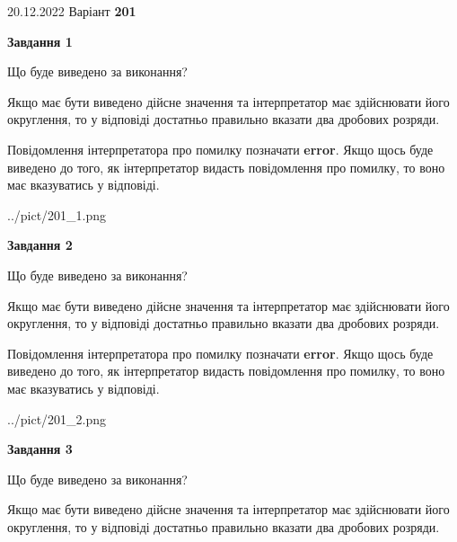 \documentclass[12pt, ukrainian]{article}
\begin{document}
{20.12.2022 Варіант \No \textbf { 201 }\par}
{
\begin {Large}

{\begin {center}\textbf{Завдання 1}\end {center}}\par
Що буде виведено за виконання? \par

Якщо має бути виведено дійсне значення та інтерпретатор має здійснювати його округлення, 
то у відповіді достатньо правильно вказати два дробових розряди.

Повідомлення інтерпретатора про помилку позначати \textbf{error}.
Якщо щось буде виведено до того, як інтерпретатор видасть повідомлення про помилку, 
то воно має вказуватись у відповіді. \par

\begin{center}
	{../pict/201_1.png}
\end{center}
\newpage

{\begin {center}\textbf{Завдання 2}\end {center}}\par
Що буде виведено за виконання? \par

Якщо має бути виведено дійсне значення та інтерпретатор має здійснювати його округлення, 
то у відповіді достатньо правильно вказати два дробових розряди.

Повідомлення інтерпретатора про помилку позначати \textbf{error}.
Якщо щось буде виведено до того, як інтерпретатор видасть повідомлення про помилку, 
то воно має вказуватись у відповіді. \par

\begin{center}
	{../pict/201_2.png}
\end{center}
\newpage

{\begin {center}\textbf{Завдання 3}\end {center}}\par
Що буде виведено за виконання? \par

Якщо має бути виведено дійсне значення та інтерпретатор має здійснювати його округлення, 
то у відповіді достатньо правильно вказати два дробових розряди.


\end{Large}}
\end{document}
